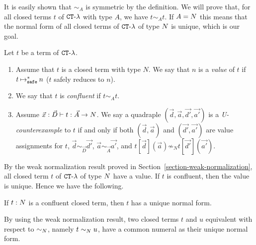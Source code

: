 It is easily shown that $\sim_A$ is symmetric by the definition. 
We will prove that, for all closed terms $t$ of ${ {\tt CT}\mbox{-}\lambda}$ with type $A$, we have $t \sim_A t$.
If $A={N}$ this means that the normal form of all closed terms of ${ {\tt CT}\mbox{-}\lambda}$ of type ${N}$ is unique,
which is our goal.

\begin{definition}
  Let $t$ be a term of ${ {\tt CT}\mbox{-}\lambda}$. 
  \begin{enumerate}
  \item
    Assume that $t$ is a closed term with type $N$. 
    We say that $n$ is a {\em value} of $t$ if $t \mathbin{\mathbin{\mapsto}_{\hbox{\scriptsize \tt safe}}^*} n$ ($t$ safely reduces to $n$). 
  \item
    We say that $t$ is {\em confluent} if $t \sim_A t$.
  \item
    Assume $\vec{x}:\vec{D}\vdash t:\vec{A}\rightarrow{N}$. 
    We say a quadraple $(\vec{d},\vec{a},\vec{d'},\vec{a'})$ is a {\em U-counterexample} to $t$
    if and only if
    both $(\vec{d},\vec{a})$ and $(\vec{d'},\vec{a'})$ are value assignments for $t$, 
    $\vec{d}\sim_{\vec{D}}\vec{d'}$, $\vec{a}\sim_{\vec{A}}\vec{a'}$, and
    $t[\vec{d}](\vec{a}) \not\sim_N t[\vec{d'}](\vec{a'})$. 
  \end{enumerate}
\end{definition}

By the weak normalization result proved in Section~\ref{section-weak-normalization}, all 
closed term $t$ of ${ {\tt CT}\mbox{-}\lambda}$ of type ${N}$ have a value. If $t$ is confluent, then the value is unique.
Hence we have the following. 

\begin{lemma}
  If $t:{N}$ is a confluent closed term, then $t$ has a unique normal form.
\end{lemma}

By using the weak normalization result, 
two closed terms $t$ and $u$ equivalent with respect to $\sim_{N}$, namely $t \sim_{N} u$,
have a common numeral as their unique normal form. 

